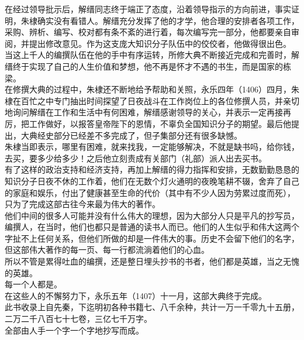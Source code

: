\begin{multicols}{\theparacolNo}
在经过领导批示后，解缙同志终于端正了态度，沿着领导指示的方向前进，事实证明，朱棣确实没有看错人。解缙充分发挥了他的才学，他合理的安排者各项工作，采购、辨析、编写、校对都有条不紊的进行着，每次编写完一部分，他都要亲自审阅，并提出修改意见。作为这支庞大知识分子队伍中的佼佼者，他做得很出色。\\

当这上千人的编撰队伍在他的手中有序运转，所修大典不断接近完成和完善时，解缙终于实现了自己的人生价值和梦想，他不再是怀才不遇的书生，而是国家的栋梁。\\

在修撰大典的过程中，朱棣还不断地给予帮助和关照，永乐四年（1406）四月，朱棣在百忙之中专门抽出时间探望了日夜战斗在工作岗位上的各位修撰人员，并亲切地询问解缙在工作和生活中有何困难，解缙感谢领导的关心，并表示一定再接再厉，把工作做好，以报答皇帝陛下的恩情，不辜负全国知识分子的期望。最后他提出，大典经史部分已经差不多完成了，但子集部分还有很多缺憾。\\

朱棣当即表示，哪里有困难，就来找我，一定能够解决，不就是缺书吗，给你钱，去买，要多少给多少！之后他立刻责成有关部门（礼部）派人出去买书。\\

有了这样的政治支持和经济支持，再加上解缙的得力指挥和安排，无数勤勤恳恳的知识分子日夜不休的工作着，他们在无数个灯火通明的夜晚笔耕不辍，舍弃了自己的家庭和娱乐，付出了健康甚至生命的代价（其中有不少人因为劳累过度而死），只为了完成这部古往今来最为伟大的著作。\\

他们中间的很多人可能并没有什么伟大的理想，因为大部分人只是平凡的抄写员，编撰人，在当时，他们也都只是普通的读书人而已。他们的人生似乎和伟大这两个字扯不上任何关系，但他们所做的却是一件伟大的事。历史不会留下他们的名字，但这部伟大著作的每一页、每一行都流淌着他们的心血。\\

所以不管是累得吐血的编撰，还是整日埋头抄书的书者，他们都是英雄，当之无愧的英雄。\\

每一个人都是。\\

在这些人的不懈努力下，永乐五年（1407）十一月，这部大典终于完成。\\

此书收录上自先秦，下迄明初各种书籍七、八千余种，共计一万一千零九十五册，二万二千八百七十七卷，三亿七千万字。\\

全部由人手一个字一个字地抄写而成。\\


\end{multicols}
